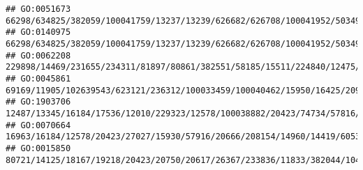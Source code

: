 \documentclass[
]{article}
\begin{document}
\begin{verbatim}
## GO:0051673                                                                                                                                                                                                                                                                                                                                     66298/634825/382059/100041759/13237/13239/626682/626708/100041952/503491
## GO:0140975                                                                                                                                                                                                                                                                                                                                     66298/634825/382059/100041759/13237/13239/626682/626708/100041952/503491
## GO:0062208                                                                                                                                                                                                                                                                                                                           229898/14469/231655/234311/81897/80861/382551/58185/15511/224840/12475/71398/12229
## GO:0045861                                                                                                                                                                                                           69169/11905/102639543/623121/236312/100033459/100040462/15950/16425/209378/14061/13011/20568/12578/20423/20617/18791/12047/18054/20701/20704/71907/15160/268885/433016/20861/100034684/20862/15511
## GO:1903706                                                                                                                                                                                             12487/13345/16184/17536/12010/229323/12578/100038882/20423/74734/57816/14255/83408/93675/12515/76527/81897/67596/17268/16160/20304/12775/20259/13386/21943/75766/57757/15001/14998/14960/15511/16149/20371/16186
## GO:0070664                                                                                                                                                                                                                                                                                                                   16963/16184/12578/20423/27027/15930/57916/20666/208154/14960/14419/60533/58205/20371/12229
## GO:0015850                                                                                                                                                                                                                                     80721/14125/18167/19218/20423/20750/20617/26367/233836/11833/382044/104158/13897/11808/66113/20897/216225/268379/76408/27404/217721/27062/20519/14419/15566/12780/434794

\end{verbatim}
\end{document}
